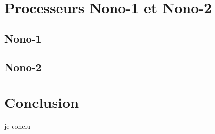 \documentclass[a4paper]{article}
\begin{document}
	\newpage	
	\section{Processeurs Nono-1 et Nono-2}
		\subsection{Nono-1}
		\subsection{Nono-2}
	

	
	
	\newpage
	\section*{Conclusion}
		\paragraph{}{je conclu}
		
	\newpage
	\listoffigures
		
\end{document}

